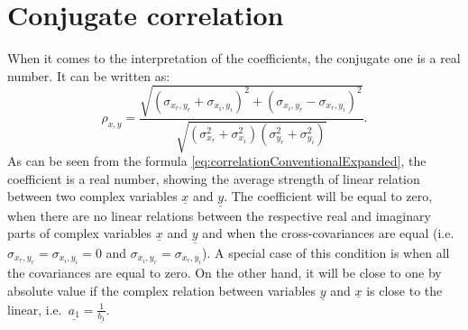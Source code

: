 \documentclass[
]{book}
\begin{document}
\hypertarget{conjugate-correlation}{%
\section{Conjugate correlation}\label{conjugate-correlation}}

When it comes to the interpretation of the coefficients, the conjugate one is a real number. It can be written as:
\begin{equation}
    {\rho}_{x,y} = \frac{\sqrt{(\sigma_{x_r, y_r} + \sigma_{x_i, y_i})^2 + (\sigma_{x_i, y_r} - \sigma_{x_r, y_i})^2}}{\sqrt{(\sigma_{x_r}^2 + \sigma_{x_i}^2)(\sigma_{y_r}^2 + \sigma_{y_i}^2)}} .
    \label{eq:correlationConventionalExpanded}
\end{equation}
As can be seen from the formula \eqref{eq:correlationConventionalExpanded}, the coefficient is a real number, showing the average strength of linear relation between two complex variables \(\underline{x}\) and \(\underline{y}\). The coefficient will be equal to zero, when there are no linear relations between the respective real and imaginary parts of complex variables \(\underline{x}\) and \(\underline{y}\) and when the cross-covariances are equal (i.e.~\(\sigma_{x_r, y_r}=\sigma_{x_i, y_i}=0\) and \(\sigma_{x_i, y_r} = \sigma_{x_r, y_i}\)). A special case of this condition is when all the covariances are equal to zero. On the other hand, it will be close to one by absolute value if the complex relation between variables \(\underline{y}\) and \(\underline{x}\) is close to the linear, i.e.~\(\underline{a_1} = \frac{1}{\underline{b_1}}\).
\end{document}
